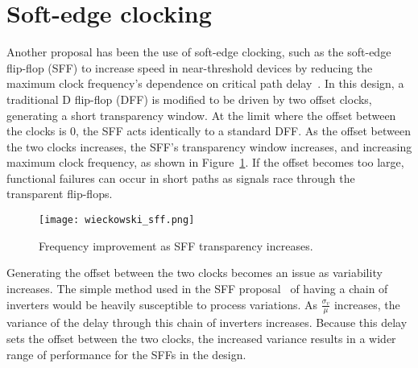  \section{Soft-edge clocking}
\label{sec:softedge}

Another proposal has been the use of soft-edge clocking, such as the soft-edge flip-flop (SFF) to increase speed in near-threshold devices by reducing the maximum clock frequency's dependence on critical path delay~\cite{Wieckowski:2008bo}.
 In this design, a traditional D flip-flop (DFF) is modified to be driven by two offset clocks, generating a short transparency window.
 At the limit where the offset between the clocks is 0, the SFF acts identically to a standard DFF.
 As the offset between the two clocks increases, the SFF's transparency window increases, and increasing maximum clock frequency, as shown in Figure~\ref{fig:sff}.
 If the offset becomes too large, functional failures can occur in short paths as signals race through the transparent flip-flops. 
\begin{figure}[thpb]
    \centering
    \texttt{[image: wieckowski\_sff.png]}
    \caption{Frequency improvement as SFF transparency increases.~\cite{Wieckowski:2008bo}}
    \label{fig:sff}
\end{figure}

Generating the offset between the two clocks becomes an issue as variability increases.
 The simple method used in the SFF proposal~\cite{Wieckowski:2008bo} of having a chain of inverters would be heavily susceptible to process variations.
As $\frac{\sigma_v}{\mu}$ increases, the variance of the delay through this chain of inverters increases.
Because this delay sets the offset between the two clocks, the increased variance results in a wider range of performance for the SFFs in the design.

